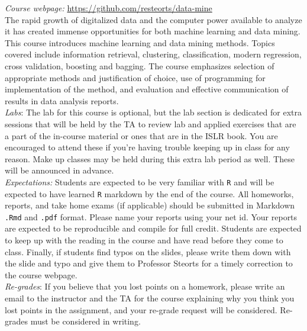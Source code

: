 \documentclass[11pt]{article}
\begin{document}
\emph{Course webpage:} \url{https://github.com/resteorts/data-mine} \\
The rapid growth of digitalized data and the computer power available to analyze it has created immense opportunities for both machine learning and data mining. This course introduces machine learning and data mining methods. Topics covered include information retrieval, clustering, classification, modern regression, cross validation, boosting and bagging. The course emphasizes selection of appropriate methods and justification of choice, use of programming for implementation of the method, and evaluation and effective communication of results in data analysis reports. \\

\emph{Labs}: The lab for this course is optional, but the lab section is dedicated for extra sessions that will be held by the TA to review lab and applied exercises that are a part of the in-course material or ones that are in the ISLR book. You are encouraged to attend these if you're having trouble keeping up in class for any reason. Make up classes may be held during this extra lab period as well. These will be announced in advance. \\


\emph{Expectations:} Students are expected to be very familiar with \texttt{R} and will be expected to have learned \texttt{R} markdown by the end of the course. All homeworks, reports, and take home exams (if applicable) should be submitted in Markdown \texttt{.Rmd} and \texttt{.pdf} format. Please name your reports using your net id. Your reports are expected to be reproducible and compile for full credit.  Students are expected to keep up with the reading in the course and have read before they come to class. Finally, if students find typos on the slides, please write them down with the slide and typo and give them to Professor Steorts for a timely correction to the course webpage.  \\

\emph{Re-grades}: If you believe that you lost points on a homework, please write an email to the instructor and the TA for the course explaining why you think you lost points in the assignment, and your re-grade request will be considered. Re-grades must be considered in writing. \\
\end{document}
